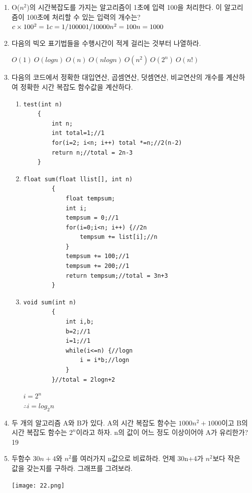 \documentclass[11pt,a4paper]{article}
\begin{document}
\begin{enumerate}
\item O($n^2$)의 시간복잡도를 가지는 알고리즘이 1초에 입력 100을 처리한다. 이 알고리즘이 100초에 처리할 수 있는 입력의 개수는?\\
$c\times 100^2=1\\ c=1/10000\\1/10000n^2=100\\n=1000$

\item 다음의 빅오 표기법들을 수행시간이 적게 걸리는 것부터 나열하라.

	$O(1)\ O(logn)\ O(n)\ O(nlogn)\ O(n^2)\ O(2^n)\ O(n!)$
	
\item 다음의 코드에서 정확한 대입연산, 곱셈연산, 덧셈연산, 비교연산의 개수를 계산하여 정확한 시간 복잡도 함수값을 계산하다.
\begin{enumerate}
	\item
	\begin{lstlisting}[frame=none] 
	test(int n)
	{
		int n;
		int total=1;//1
		for(i=2; i<n; i++) total *=n;//2(n-2)
		return n;//total = 2n-3
	}
	\end{lstlisting}
	
	\item
	\begin{lstlisting}[frame=none]
		float sum(float llist[], int n)
		{
			float tempsum;
			int i;
			tempsum = 0;//1
			for(i=0;i<n; i++) {//2n
				tempsum += list[i];//n
			}
			tempsum += 100;//1
			tempsum += 200;//1
			return tempsum;//total = 3n+3
		}
	\end{lstlisting}
	
	\item
	\begin{lstlisting}[frame=none]
		void sum(int n)
		{
			int i,b;
			b=2;//1
			i=1;//1
			while(i<=n) {//logn
				i = i*b;//logn
			}
		}//total = 2logn+2
	\end{lstlisting}
	$i = 2^n$\\
	 $\therefore i = log_2n$ 
\end{enumerate}
\item 두 개의 알고리즘 A와 B가 있다. A의 시간 복잡도 함수는 $1000n^2+1000$이고 B의 시간 복잡도 함수는 $2^n$이라고 하자. n의 값이 어느 정도 이상이어야 A가 유리한가? 19

\item 두함수 $30n+4$와 $n^2$를 여러가지 n값으로 비료하라. 언제 30n+4가 $n^2$보다 작은 값을 갖는지를 구하라. 그래프를 그려보라.

\texttt{[image: 22.png]}


\end{enumerate}
\end{document}
